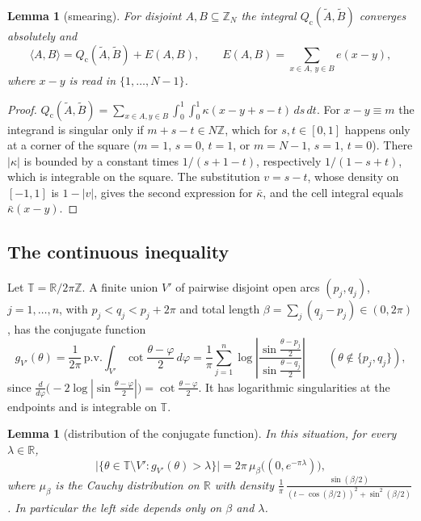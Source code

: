 \documentclass[11pt]{amsart}
\newtheorem{lemma}[theorem]{Lemma}
\theoremstyle{definition}
\theoremstyle{remark}
\newcommand{\Z}{\mathbb{Z}}
\newcommand{\R}{\mathbb{R}}
\newcommand{\T}{\mathbb{T}}
\newcommand{\ip}[2]{\langle #1,#2\rangle}
\newcommand{\Qc}{Q_{\mathrm{c}}}
\newcommand{\kb}{\bar\kappa}
\begin{document}
\begin{lemma}[smearing]\label{lem:smear}
For disjoint $A,B\subseteq\Z_N$ the integral $\Qc(\widetilde A,\widetilde B)$ converges absolutely and
\[
\ip AB=\Qc(\widetilde A,\widetilde B)+E(A,B),\qquad E(A,B)=\sum_{x\in A,\,y\in B}e(x-y),
\]
where $x-y$ is read in $\{1,\dots,N-1\}$.
\end{lemma}

\begin{proof}
$\Qc(\widetilde A,\widetilde B)=\sum_{x\in A,y\in B}\int_0^1\int_0^1\kappa(x-y+s-t)\,ds\,dt$. For $x-y\equiv m$ the
integrand is singular only if $m+s-t\in N\Z$, which for $s,t\in[0,1]$ happens only at a corner of the square
($m=1$, $s=0$, $t=1$, or $m=N-1$, $s=1$, $t=0$). There $|\kappa|$ is bounded by a constant times
$1/(s+1-t)$, respectively $1/(1-s+t)$, which is integrable on the square. The substitution $v=s-t$, whose density
on $[-1,1]$ is $1-|v|$, gives the second expression for $\kb$, and the cell integral equals $\kb(x-y)$.
\end{proof}

\subsection{The continuous inequality}
Let $\T=\R/2\pi\Z$. A finite union $V'$ of pairwise disjoint open arcs $(p_j,q_j)$, $j=1,\dots,n$, with
$p_j<q_j<p_j+2\pi$ and total length $\beta=\sum_j(q_j-p_j)\in(0,2\pi)$, has the conjugate function
\begin{equation}\label{eq:conj}
g_{V'}(\theta)=\frac1{2\pi}\,\mathrm{p.v.}\!\int_{V'}\cot\frac{\theta-\varphi}{2}\,d\varphi
=\frac1\pi\sum_{j=1}^n\log\left|\frac{\sin\frac{\theta-p_j}2}{\sin\frac{\theta-q_j}2}\right|
\qquad(\theta\notin\{p_j,q_j\}),
\end{equation}
since $\frac{d}{d\varphi}\bigl(-2\log|\sin\frac{\theta-\varphi}2|\bigr)=\cot\frac{\theta-\varphi}2$. It has logarithmic
singularities at the endpoints and is integrable on $\T$.

\begin{lemma}[distribution of the conjugate function]\label{lem:boole}
In this situation, for every $\lambda\in\R$,
\[
\bigl|\{\theta\in\T\setminus V':g_{V'}(\theta)>\lambda\}\bigr|=2\pi\,\mu_\beta\bigl((0,e^{-\pi\lambda})\bigr),
\]
where $\mu_\beta$ is the Cauchy distribution on $\R$ with density
$\frac1\pi\,\frac{\sin(\beta/2)}{(t-\cos(\beta/2))^2+\sin^2(\beta/2)}$. In particular the left side depends only on
$\beta$ and $\lambda$.
\end{lemma}
\end{document}
